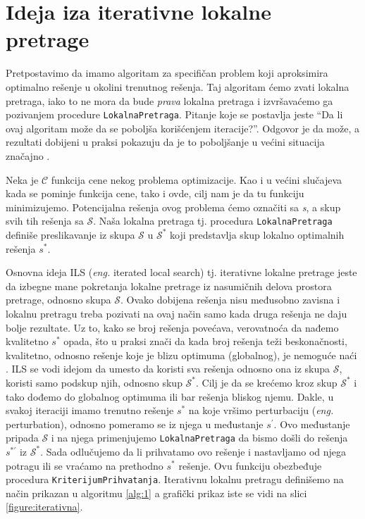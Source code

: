 \documentclass[a4paper]{article}
\newcommand{\q}[1]{``#1''}  %
\newcommand{\s}[0]{\textit{s}} %
\newcommand{\sstar}[0]{$\textit{s}^*$}
\newcommand{\squote}[0]{$\textit{s}^\prime$}
\renewcommand{\S}[0]{$\mathcal{S}$} %
\newcommand{\Sstar}[0]{$\mathcal{S}^{*}$}
\newcommand{\eng}[1]{(\textit{eng.} #1)}
\newcommand{\lokalna}[0]{\small{\texttt{LokalnaPretraga}}}
\newcommand{\kriterijum}[0]{\small{\texttt{KriterijumPrihvatanja}}}
\begin{document}
\section{Ideja iza iterativne lokalne pretrage}
Pretpostavimo da imamo algoritam za specifičan problem koji aproksimira optimalno rešenje u okolini trenutnog rešenja. 
Taj algoritam ćemo zvati lokalna pretraga, iako to ne mora da bude \textit{prava} lokalna pretraga i  
izvršavaćemo ga pozivanjem procedure \lokalna{}. Pitanje koje se postavlja jeste \q{Da li 
ovaj algoritam može da se poboljša korišćenjem iteracije?}. Odgovor je da može, a rezultati dobijeni u praksi pokazuju 
da je to poboljšanje u većini situacija značajno \cite{beginnersIntroduction}.\footnotemark
{} 

Neka je $\mathcal{C}$ funkcija cene nekog problema optimizacije. Kao i u većini slučajeva kada se pominje funkcija cene,
tako i ovde, cilj nam je da tu funkciju minimizujemo. Potencijalna rešenja ovog problema ćemo označiti sa \s{}, 
a skup svih tih rešenja sa \S{}. Naša lokalna pretraga tj. procedura \lokalna{} definiše preslikavanje 
iz skupa \S{} u \Sstar{} koji predstavlja skup lokalno optimalnih rešenja \sstar{}.

Osnovna ideja ILS \eng{iterated local search} tj. iterativne lokalne pretrage jeste da izbegne mane pokretanja lokalne pretrage iz nasumičnih delova prostora pretrage, 
odnosno skupa \S{}. Ovako dobijena rešenja nisu međusobno zavisna i lokalnu pretragu treba pozivati na ovaj način samo kada druga rešenja ne daju bolje rezultate.\footnotemark
{} 
Uz to, kako se broj rešenja povećava, verovatnoća da nađemo kvalitetno \sstar{} opada, što u praksi znači da kada broj rešenja teži beskonačnosti, kvalitetno, odnosno rešenje koje je blizu optimuma (globalnog), je 
nemoguće naći \cite{handbookOfMetaheuristics}. ILS se vodi idejom da umesto da koristi sva rešenja odnosno ona iz skupa \S{}, koristi samo podskup njih, odnosno skup \Sstar{}. 
Cilj je da se krećemo kroz skup \Sstar{} i tako dođemo do globalnog optimuma ili bar rešenja bliskog njemu.
Dakle, u svakoj iteraciji imamo trenutno rešenje \sstar{} na koje vršimo perturbaciju \eng{perturbation}, odnosno pomeramo se iz njega u međustanje 
\squote{}. Ovo međustanje pripada \S{} i na njega primenjujemo \lokalna{} da bismo došli do rešenja $\textit{s}^{*\prime}$ iz \Sstar{}. Sada odlučujemo da li prihvatamo ovo rešenje i nastavljamo od njega potragu ili 
se vraćamo na prethodno \sstar{} rešenje. Ovu funkciju obezbeđuje procedura \kriterijum{}.
Iterativnu lokalnu pretragu definišemo na način prikazan u algoritmu \ref{alg:1} a grafički prikaz iste se vidi na slici \ref{figure:iterativna}.
\end{document}
